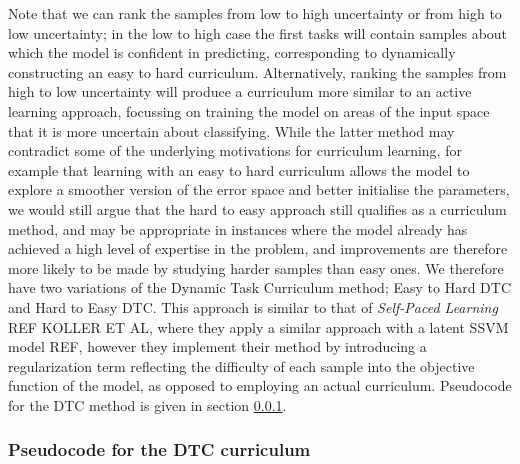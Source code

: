 Note that we can rank the samples from low to high uncertainty or from high to low uncertainty; in the low to high case the first tasks will contain samples about which the model is confident in predicting, corresponding to dynamically constructing an easy to hard curriculum. Alternatively, ranking the samples from high to low uncertainty will produce a curriculum more similar to an active learning approach, focussing on training the model on areas of the input space that it is more uncertain about classifying. While the latter method may contradict some of the underlying motivations for curriculum learning, for example that learning with an easy to hard curriculum allows the model to explore a smoother version of the error space and better initialise the parameters, we would still argue that the hard to easy approach still qualifies as a curriculum method, and may be appropriate in instances where the model already has achieved a high level of expertise in the problem, and improvements are therefore more likely to be made by studying harder samples than easy ones.  We therefore have two variations of the Dynamic Task Curriculum method; Easy to Hard DTC and Hard to Easy DTC. This approach is similar to that of \textit{Self-Paced Learning} REF KOLLER ET AL, where they apply a similar approach with a latent SSVM model REF, however they implement their method by introducing a regularization term reflecting the difficulty of each sample into the objective function of the model, as opposed to employing an actual curriculum. Pseudocode for the DTC method is given in section \ref{sec:DTCPseudocode}.

\subsubsection{Pseudocode for the DTC curriculum}\label{sec:DTCPseudocode}

